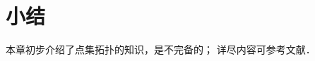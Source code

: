 






\section*{小结}
本章初步介绍了点集拓扑的知识，是不完备的；
详尽内容可参考文献\parencite{munkres-2000-topology}．




\printbibliography[heading=subbibliography, title=第\ref{chtop}章参考文献]
\endinput
